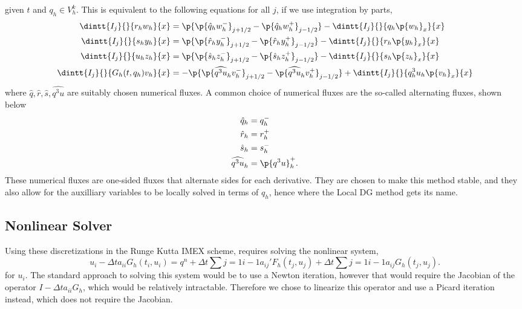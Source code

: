 given \(t\) and \(q_h \in V_h^k\).
This is equivalent to the following equations for all \(j\), if we use integration
by parts,
\begin{align}
  \dintt{I_j}{}{r_h w_h}{x} &= \p{\p{\hat{q}_h w^-_h}_{j+1/2}
  - \p{\hat{q}_h w^+_h}_{j-1/2}} - \dintt{I_j}{}{q_h \p{w_h}_x}{x} \\
  \dintt{I_j}{}{s_h y_h}{x} &= \p{\p{\hat{r}_h y^-_h}_{j+1/2}
  - \p{\hat{r}_h y^+_h}_{j-1/2}} - \dintt{I_j}{}{r_h \p{y_h}_x}{x} \\
  \dintt{I_j}{}{u_h z_h}{x} &= \p{\p{\hat{s}_h z^-_h}_{j+1/2}
  - \p{\hat{s}_h z^+_h}_{j-1/2}} - \dintt{I_j}{}{s_h \p{z_h}_x}{x} \\
  \dintt{I_j}{}{G_h(t, q_h) v_h}{x} &= -\p{\p{\widehat{q^3 u}_h v^-_h}_{j+1/2}
  - \p{\widehat{q^3 u}_h v^+_h}_{j-1/2}} + \dintt{I_j}{}{q_h^3 u_h \p{v_h}_x}{x}
\end{align}
where \(\hat{q}, \hat{r}, \hat{s}, \widehat{q^3 u}\) are suitably chosen numerical fluxes.
A common choice of numerical fluxes are the so-called alternating fluxes, shown below
\begin{align}
  \hat{q}_h &= q^-_h \\
  \hat{r}_h &= r^+_h \\
  \hat{s}_h &= s^-_h \\
  \widehat{q^3 u}_h &= \p{q^3 u}^+_h.
\end{align}
These numerical fluxes are one-sided fluxes that alternate sides for each
derivative.
They are chosen to make this method stable, and they also allow for the auxilliary
variables to be locally solved in terms of \(q_h\), hence where the Local DG method
gets its name.

\subsection{Nonlinear Solver}
Using these discretizations in the Runge Kutta IMEX scheme, requires solving the
nonlinear system,
\begin{equation}
  u_i - \Delta t a_{ii} G_h(t_i, u_i) = q^n
  + \Delta t \sum{j = 1}{i-1}{a_{ij}' F_h(t_j, u_j)}
  + \Delta t \sum{j=1}{i-1}{a_{ij} G_h(t_j, u_j)}.
\end{equation}
for \(u_i\).
The standard approach to solving this system would be to use a Newton iteration,
however that would require the Jacobian of the operator \(I - \Delta t a_{ii} G_h\),
which would be relatively intractable.
Therefore we chose to linearize this operator and use a Picard iteration instead,
which does not require the Jacobian.

